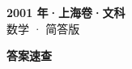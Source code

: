 \documentclass[zihao=-4, a4paper]{ctexart}
\begin{document}
\begin{center}
  {\Large\bfseries 2001 年·上海卷·文科}\\[4pt]
  {\large 数学 · 简答版}
\end{center}
\medskip
{}

\clearpage
{}
\begin{center}{\Large\bfseries 答案速查}\end{center}
\medskip

\end{document}
